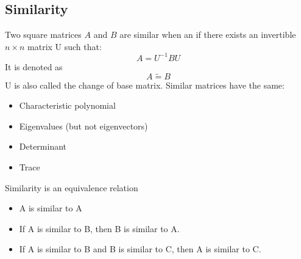\subsection{Similarity}\label{similiarity}
Two square matrices $A$ and $B$ are similar when an if there exists an invertible $n \times n$ matrix U such that:
\begin{equation}
    A = U^{-1}BU
\end{equation}
It is denoted as
\begin{equation*}
    A \tilde{=} B
\end{equation*}
U is also called the change of base matrix.
Similar matrices have the same:
\begin{itemize}
    \item Characteristic polynomial
    \item Eigenvalues (but not eigenvectors)
    \item Determinant
    \item Trace
\end{itemize}
Similarity is an equivalence relation
\begin{itemize}
    \item A is similar to A
    \item If A is similar to B, then B is similar to A.
    \item If A is similar to B and B is similar to C, then A is similar to C.
\end{itemize}
